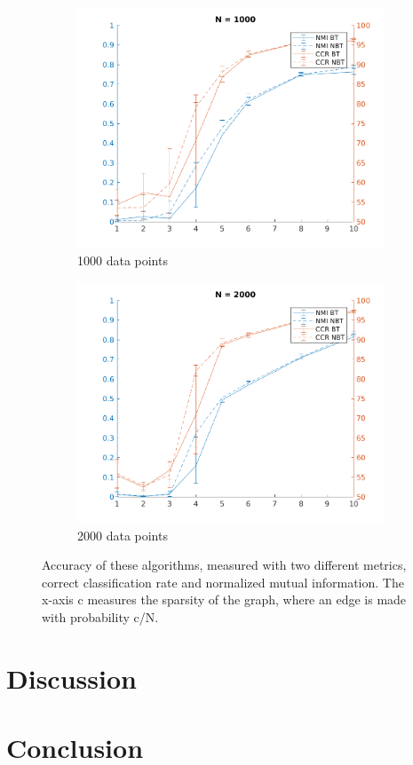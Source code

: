 \documentclass{article}
\begin{document}
\begin{figure}[h]
 
 \begin{subfigure}{0.5\textwidth}
 \includegraphics[width=.95\linewidth]{N1000variedc} 
 \caption{1000 data points}
 \label{fig:subim1}
 \end{subfigure}
 \begin{subfigure}{0.5\textwidth}
 \includegraphics[width=.95\linewidth]{N2000variedc}
 \caption{2000 data points}
 \label{fig:subim2}
 \end{subfigure}
 \caption{Accuracy of these algorithms, measured with two different metrics,
 correct classification rate and normalized mutual information. The x-axis c
 measures the sparsity of the graph, where an edge is made with probability
 c/N.}
 \label{fig:image2}
 \end{figure}

 \section{Discussion}

 \section{Conclusion}

 \printbibliography

 
\end{document}
